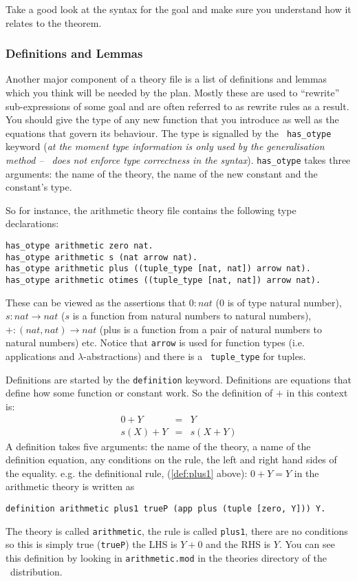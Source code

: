 Take a good look at the syntax for the goal and make sure you
understand how it relates to the theorem.  

\subsubsection{Definitions and Lemmas}

Another major component of a theory file is a list of
definitions and lemmas which you 
think will be needed by the plan.  Mostly these are used
to ``rewrite'' sub-expressions of some goal and are often referred to
as rewrite rules as a result.
You should give the type of any new
function that you introduce as well as the equations that govern its
behaviour.  The type is signalled by the {\tt
has\_otype} keyword ({\em at the 
moment type information is only used by the
generalisation method -- \lclam\ does not
enforce type correctness in the syntax}).  {\tt has\_otype} takes
three arguments: the name of the theory, the name of the new constant
and the constant's type.

So for instance, the arithmetic theory file
contains the following 
type declarations:
\begin{verbatim}
has_otype arithmetic zero nat.
has_otype arithmetic s (nat arrow nat).
has_otype arithmetic plus ((tuple_type [nat, nat]) arrow nat).
has_otype arithmetic otimes ((tuple_type [nat, nat]) arrow nat).
\end{verbatim}
These can be viewed as the assertions that $0:nat$ ($0$ is of type
natural number), $s:nat \rightarrow nat$ ($s$ is a function from
natural numbers to natural numbers), $+:(nat, nat) \rightarrow nat$
(plus is a function from a pair of natural numbers to natural numbers) 
etc.
Notice that {\tt arrow} is used for function types
(i.e. applications and $\lambda$-abstractions) and there is a {\tt
tuple\_type} for tuples.

Definitions are started by the {\tt definition}
keyword.  Definitions are equations that define how some function or
constant work.  So the definition of $+$ in this context is:
\begin{eqnarray}
0 + Y & = & Y \label{def:plus1} \\
s(X) + Y & = & s(X + Y)
\end{eqnarray}
A definition takes five arguments: the name of the theory, a name of 
the definition equation, any conditions on the rule, the left and
right hand sides of the equality.  e.g. the definitional rule,
(\ref{def:plus1} above): $0 + Y = Y$ in
the arithmetic theory is written as
\begin{verbatim}
definition arithmetic plus1 trueP (app plus (tuple [zero, Y])) Y.
\end{verbatim}
The theory is called {\tt arithmetic}, the rule is called {\tt plus1},
there are  
no conditions so this is simply true ({\tt trueP}) the
LHS is $Y + 0$ and the RHS is $Y$.  You can see this definition by
looking in {\tt arithmetic.mod} in the theories directory of the
\lclam\ distribution.

